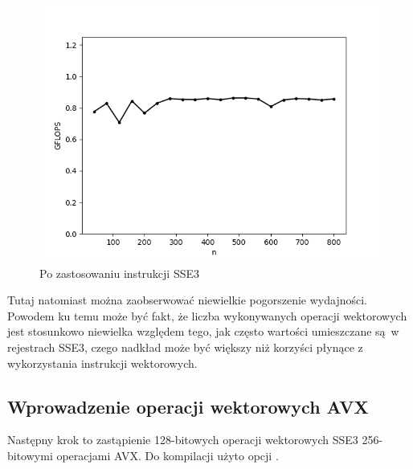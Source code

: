 \documentclass{article}
\begin{document}
\begin{figure}[H]
    \centering
    \includegraphics[width=1.0\textwidth]{figures/fig3.png}
    \caption{Po zastosowaniu instrukcji SSE3}
\end{figure}

Tutaj natomiast można zaobserwować niewielkie pogorszenie wydajności.
Powodem ku temu może być fakt, że liczba wykonywanych operacji wektorowych jest stosunkowo
niewielka względem tego, jak często wartości umieszczane są w rejestrach SSE3, czego nadkład
może być większy niż korzyści płynące z wykorzystania instrukcji wektorowych.

\subsection{Wprowadzenie operacji wektorowych AVX}

Następny krok to zastąpienie 128-bitowych operacji wektorowych SSE3 256-bitowymi operacjami AVX.
Do kompilacji użyto opcji .
\end{document}
